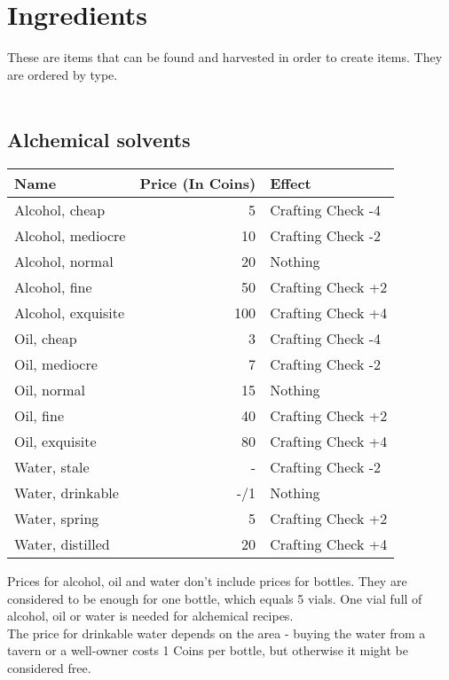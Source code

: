 \section{Ingredients}\label{sec:ingredients}
These are items that can be found and harvested in order to create items.
They are ordered by type.\\
\\

\subsection{Alchemical solvents}\label{subsec:solvents}
\begin{longtable}{l | r | l}
	Name & Price (In Coins) & Effect\\ \hline
	Alcohol, cheap & 5 & Crafting Check -4\\
	Alcohol, mediocre & 10 & Crafting Check -2\\
	Alcohol, normal & 20 & Nothing\\
	Alcohol, fine & 50 & Crafting Check +2\\
	Alcohol, exquisite & 100 & Crafting Check +4\\
	Oil, cheap & 3 & Crafting Check -4\\
	Oil, mediocre & 7 & Crafting Check -2\\
	Oil, normal & 15 & Nothing\\
	Oil, fine & 40 & Crafting Check +2\\
	Oil, exquisite & 80 & Crafting Check +4\\
	Water, stale & - & Crafting Check -2\\
	Water, drinkable & -/1 & Nothing\\
	Water, spring & 5 & Crafting Check +2\\
	Water, distilled & 20 & Crafting Check +4\\
\end{longtable}

Prices for alcohol, oil and water don't include prices for bottles.
They are considered to be enough for one bottle, which equals 5 vials.
One vial full of alcohol, oil or water is needed for alchemical recipes. \\

The price for drinkable water depends on the area - buying the water from a tavern or a well-owner costs 1 Coins per bottle, but otherwise it might be considered free.\\



